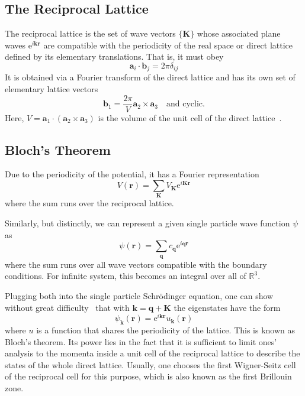 \documentclass[a4paper,DIV=12,english]{scrartcl}
\begin{document}
\subsection{The Reciprocal Lattice}
The reciprocal lattice is the set of wave vectors $\{\textbf{K}\}$ whose associated plane waves $\text{e}^{i\textbf{k}\textbf{r}}$ are compatible with the periodicity of the real space or direct lattice defined by its elementary translations. That is, it must obey
\begin{equation}
    \textbf{a}_i \cdot \textbf{b}_j = 2\pi \delta_{ij}
\end{equation}
It is obtained via a Fourier transform of the direct lattice and has its own set of elementary lattice vectors
\begin{equation}
    \textbf{b}_1 = \frac{2\pi}{V} \textbf{a}_2 \times \textbf{a}_3 \quad \text{and cyclic.}
\end{equation}
Here, $V=\textbf{a}_1 \cdot (\textbf{a}_2 \times \textbf{a}_3)$ is the volume of the unit cell of the direct lattice~\cite{theoFestkörper}.

\subsection{Bloch's Theorem}
Due to the periodicity of the potential, it has a Fourier representation
\begin{equation}
    V(\textbf{r}) = \sum_\textbf{K} V_\textbf{K} \text{e}^{i\textbf{K}\textbf{r}} 
\end{equation}
where the sum runs over the reciprocal lattice.

Similarly, but distinctly, we can represent a given single particle wave function $\psi$ as 
\begin{equation}
    \psi(\textbf{r}) = \sum_\textbf{q} c_\textbf{q} \text{e}^{i\textbf{q}\textbf{r}} 
\end{equation}
where the sum runs over all wave vectors compatible with the boundary conditions. For infinite system, this becomes an integral over all of $\mathbb{R}^3$.

Plugging both into the single particle Schrödinger equation, one can show without great difficulty~\cite{Thijssen2007cp} that with $\textbf{k}=\textbf{q} + \textbf{K}$ the eigenstates have the form 
\begin{equation}
    \psi_\textbf{k}(\textbf{r}) = \text{e}^{i\textbf{k}\textbf{r}} u_\textbf{k}(\textbf{r})
\end{equation}
where $u$ is a function that shares the periodicity of the lattice. This is known as Bloch's theorem. Its power lies in the fact that it is sufficient to limit ones' analysis to the momenta inside a unit cell of the reciprocal lattice to describe the states of the whole direct lattice. Usually, one chooses the first Wigner-Seitz cell of the reciprocal cell for this purpose, which is also known as the first Brillouin zone.
\end{document}
